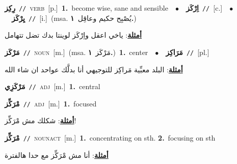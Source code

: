 \documentclass[10pt,a4paper,twoside]{article} %
\begin{document}
\begin{multicols}{2}
{\setlength\topsep{0pt}\textbf{\foreignlanguage{arabic}{رِكِز}}\ {\color{gray}\texttt{//}\color{black}}\ \textsc{verb}\ [p.]\ \textbf{1.}~become wise, sane and sensible\ \ $\bullet$\ \ \setlength\topsep{0pt}\textbf{\foreignlanguage{arabic}{اِرْكَز}}\ {\color{gray}\texttt{//}\color{black}}\ [c.]\ \ $\bullet$\ \ \setlength\topsep{0pt}\textbf{\foreignlanguage{arabic}{يِرْكَز}}\ {\color{gray}\texttt{//}\color{black}}\ [i.]\ \color{gray}(msa. \foreignlanguage{arabic}{يُصْبِح حكيم وعاقِل}~\foreignlanguage{arabic}{\textbf{١.}})\color{black}\  \begin{flushright}\color{gray}\foreignlanguage{arabic}{\textbf{\underline{\foreignlanguage{arabic}{أمثلة}}}: ياخي اعقل واِرْكَز لوينتا بدك تضل تتهامل}\end{flushright}\color{black}} \vspace{2mm}

{\setlength\topsep{0pt}\textbf{\foreignlanguage{arabic}{مَرْكَز}}\ {\color{gray}\texttt{//}\color{black}}\ \textsc{noun}\ [m.]\ \color{gray}(msa. \foreignlanguage{arabic}{مَرْكَز}~\foreignlanguage{arabic}{\textbf{١.}})\color{black}\ \textbf{1.}~center\ \ $\bullet$\ \ \setlength\topsep{0pt}\textbf{\foreignlanguage{arabic}{مَرَاكِز}}\ {\color{gray}\texttt{//}\color{black}}\ [pl.]\  \begin{flushright}\color{gray}\foreignlanguage{arabic}{\textbf{\underline{\foreignlanguage{arabic}{أمثلة}}}: البلد معبِّية مَراكِز للتوجيهي أنا بدلَّك عواحد ان شاء الله}\end{flushright}\color{black}} \vspace{2mm}

{\setlength\topsep{0pt}\textbf{\foreignlanguage{arabic}{مَرْكَزِي}}\ {\color{gray}\texttt{//}\color{black}}\ \textsc{adj}\ [m.]\ \textbf{1.}~central\ } \vspace{2mm}

{\setlength\topsep{0pt}\textbf{\foreignlanguage{arabic}{مْرَكِّز}}\ {\color{gray}\texttt{//}\color{black}}\ \textsc{adj}\ [m.]\ \textbf{1.}~focused\  \begin{flushright}\color{gray}\foreignlanguage{arabic}{\textbf{\underline{\foreignlanguage{arabic}{أمثلة}}}: شكلك مش مْرَكِّز!}\end{flushright}\color{black}} \vspace{2mm}

{\setlength\topsep{0pt}\textbf{\foreignlanguage{arabic}{مْرَكِّز}}\ {\color{gray}\texttt{//}\color{black}}\ \textsc{noun\textunderscore act}\ [m.]\ \textbf{1.}~concentrating on sth.  \textbf{2.}~focusing on sth\  \begin{flushright}\color{gray}\foreignlanguage{arabic}{\textbf{\underline{\foreignlanguage{arabic}{أمثلة}}}: أنا مش مْرَكِّز مع حدا هالفترة}\end{flushright}\color{black}} \vspace{2mm}


\end{multicols}
\end{document}
